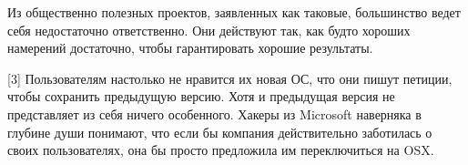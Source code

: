 \documentclass[ebook,12pt,oneside,openany]{memoir}
\begin{document}
Из общественно полезных проектов, заявленных как таковые, большинство
ведет себя недостаточно ответственно. Они действуют так, как будто
хороших намерений достаточно, чтобы гарантировать хорошие результаты.

[3] Пользователям настолько не нравится их новая ОС, что они пишут
петиции, чтобы сохранить предыдущую версию. Хотя и предыдущая версия
не представляет из себя ничего особенного. Хакеры из Microsoft
наверняка в глубине души понимают, что если бы компания действительно
заботилась о своих пользователях, она бы просто предложила им
переключиться на OSX.
\end{document}
